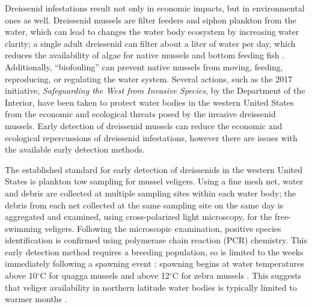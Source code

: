 \documentclass[12pt]{article}\usepackage[]{graphicx}\usepackage[]{color}
\begin{document}
Dreissenid infestations result not only in economic impacts, but in environmental ones as well. Dreissenid mussels are filter feeders and siphon plankton from the water, which can lead to changes the water body ecosystem by increasing water clarity; a single adult dreissenid can filter about a liter of water per day, which reduces the availability of algae for native mussels and bottom feeding fish \cite{BOR}. Additionally, ``biofouling'' can prevent native mussels from moving, feeding, reproducing, or regulating the water system. Several actions, such as the 2017 initiative, \textit{Safeguarding the West from Invasive Species}, by the Department of the Interior, have been taken to protect water bodies in the western United States from the economic and ecological threats posed by the invasive dreissenid mussels. Early detection of dreissenid mussels can reduce the economic and ecological repercussions of dreissenid infestations, however there are issues with the available early detection methods. 

The established standard for early detection of dreissenids in the western United States is plankton tow sampling for mussel veligers. Using a fine mesh net, water and debris are collected at multiple sampling sites within each water body; the debris from each net collected at the same sampling site on the same day is aggregated and examined, using cross-polarized light microscopy, for the free-swimming veligers. Following the microscopic examination, positive species identification is confirmed using polymerase chain reaction (PCR) chemistry. This early detection method requires a breeding population, so is limited to the weeks immediately following a spawning event \cite{Nichols}; spawning begins at water temperatures above 10$^\circ$C for quagga mussels and above 12$^\circ$C for zebra mussels \cite{McMahon, Mills}. This suggests that veliger availability in northern latitude water bodies is typically limited to warmer months \cite{Sepulveda:eDNA}.
\end{document}
